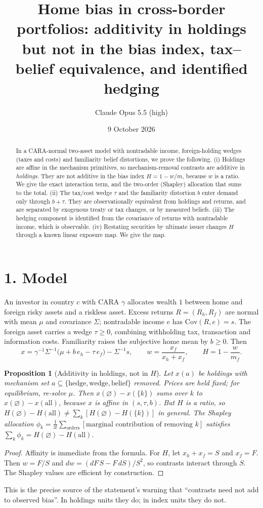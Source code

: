 \documentclass[11pt]{article}
\title{Home bias in cross-border portfolios: additivity in holdings but not in the bias index, tax--belief equivalence, and identified hedging}
\author{Claude Opus 5.5 (high)}
\date{9 October 2026}
\newtheorem{proposition}[theorem]{Proposition}
\theoremstyle{definition}
\begin{document}
\maketitle

\begin{abstract}
In a CARA-normal two-asset model with nontradable income, foreign-holding wedges (taxes and costs) and familiarity belief
distortions, we prove the following.
(i) Holdings are affine in the mechanism primitives, so mechanism-removal contrasts are additive in \emph{holdings}. They are
not additive in the bias index $H=1-w/m$, because $w$ is a ratio. We give the exact interaction term, and the two-order (Shapley)
allocation that sums to the total.
(ii) The tax/cost wedge $\tau$ and the familiarity distortion $b$ enter demand only through $b+\tau$. They are observationally
equivalent from holdings and returns, and are separated by exogenous treaty or tax changes, or by measured beliefs.
(iii) The hedging component is identified from the covariance of returns with nontradable income, which is observable.
(iv) Restating securities by ultimate issuer changes $H$ through a known linear exposure map. We give the map.
\end{abstract}

\section*{1. Model}
An investor in country $c$ with CARA $\gamma$ allocates wealth $1$ between home and foreign risky assets and a riskless asset.
Excess returns $R=(R_h,R_f)$ are normal with mean $\mu$ and covariance $\Sigma$; nontradable income $e$ has
$\mathrm{Cov}(R,e)=s$. The foreign asset carries a wedge $\tau\ge0$, combining withholding tax, transaction and information
costs. Familiarity raises the subjective home mean by $b\ge0$. Then
\[
 x=\gamma^{-1}\Sigma^{-1}\bigl(\mu+b\,e_h-\tau\,e_f\bigr)-\Sigma^{-1}s,\qquad w=\frac{x_f}{x_h+x_f},\qquad H=1-\frac{w}{m_f}.
\]

\begin{proposition}[Additivity in holdings, not in $H$]\label{prop:add}
Let $x(a)$ be holdings with mechanism set $a\subseteq\{\text{hedge},\text{wedge},\text{belief}\}$ removed. Prices are held
fixed; for equilibrium, re-solve $\mu$. Then $x(\varnothing)-x(\{k\})$ sums over $k$ to $x(\varnothing)-x(\text{all})$, because
$x$ is affine in $(s,\tau,b)$. But $H$ is a ratio, so
$H(\varnothing)-H(\text{all})\ne\sum_k[H(\varnothing)-H(\{k\})]$ in general. The Shapley allocation
$\phi_k=\frac1{3!}\sum_{\text{orders}}[\text{marginal contribution of removing }k]$ satisfies $\sum_k\phi_k=H(\varnothing)-H(\text{all})$.
\end{proposition}
\begin{proof}
Affinity is immediate from the formula. For $H$, let $x_h+x_f=S$ and $x_f=F$. Then $w=F/S$ and
$dw=(dF\,S-F\,dS)/S^2$, so contrasts interact through $S$. The Shapley values are efficient by construction.
\end{proof}
This is the precise source of the statement's warning that ``contrasts need not add to observed bias''. In holdings units
they do; in index units they do not.
\end{document}
